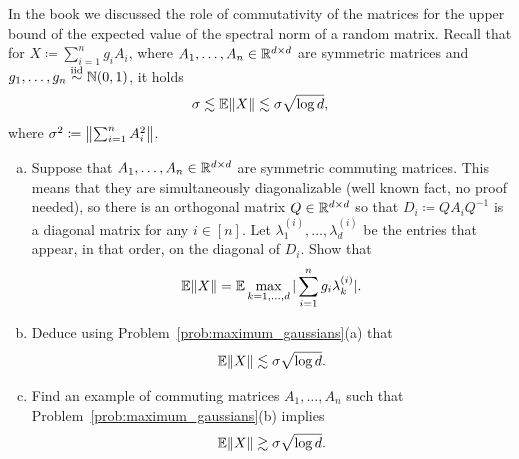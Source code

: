 \begin{myexercise}\label{prob:NCK_commuting}
    In the book we discussed the role of commutativity of the matrices for the upper bound of the expected value of the spectral norm of a random matrix. Recall that for $X \coloneqq \sum_{i=1}^n g_i A_i$, where $A_1, \dots, A_n \in \mathbb{R}^{d\times d}$ are symmetric matrices and $g_1, \dots, g_n \overset{\text{iid}}{\sim} \mathbb{N}(0,1)$, it holds
    \begin{equation*}
        \sigma \lesssim \mathbb{E} {\left\lVert{X}\right\rVert} \lesssim  \sigma \sqrt{\log d},
    \end{equation*}
    where $\sigma^2 \coloneqq {\left\lVert{ \sum_{i=1}^n A_i^2}\right\rVert}$.
    
    \begin{enumerate}[(a)]
        \item Suppose that $A_1, \dots, A_n \in \mathbb{R}^{d\times d}$ are symmetric commuting matrices. This means that they are simultaneously diagonalizable (well known fact, no proof needed), so there is an orthogonal matrix $Q \in \mathbb{R}^{d \times d}$ so that $D_i \coloneqq Q A_i Q^{-1}$ is a diagonal matrix for any $i \in [n]$. Let $\lambda^{(i)}_{1}, \dots, \lambda^{(i)}_{d}$ be the entries that appear, in that order, on the diagonal of $D_i$. Show that
        \begin{equation*}
            \mathbb{E}{\left\lVert{ X }\right\rVert} = \mathbb{E} \max_{k = 1, \ldots, d} |\sum_{i=1}^n g_i \lambda^{(i)}_{k}|.
        \end{equation*}
        
        \item Deduce using Problem~\ref{prob:maximum_gaussians}(a) that  
        \begin{equation*}
            \mathbb{E} {\left\lVert{X}\right\rVert} \lesssim \sigma \sqrt{\log d}.
        \end{equation*}
        
        \item Find an example of commuting matrices $A_1, \dots, A_n$ such that Problem~\ref{prob:maximum_gaussians}(b) implies
        \begin{equation*}
            \mathbb{E} {\left\lVert{X}\right\rVert} \gtrsim \sigma \sqrt{\log d}.
        \end{equation*}
    \end{enumerate}
\end{myexercise}




